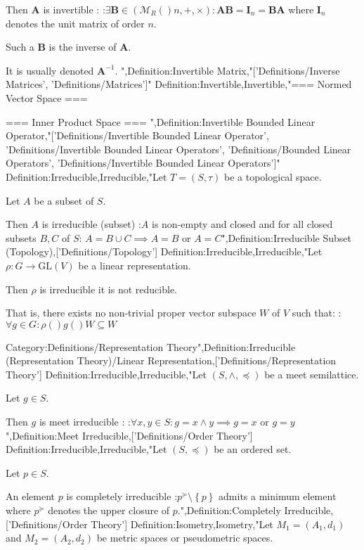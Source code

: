 Then $\mathbf A$ is invertible :
:$\exists \mathbf B \in \left( \mathcal M_R \left(   \right)n, +, \times \right): \mathbf A \mathbf B = \mathbf I_n = \mathbf B \mathbf A$
where $\mathbf I_n$ denotes the unit matrix of order $n$.


Such a $\mathbf B$ is the inverse of $\mathbf A$.

It is usually denoted $\mathbf A^{-1}$.
",Definition:Invertible Matrix,"['Definitions/Inverse Matrices', 'Definitions/Matrices']"
Definition:Invertible,Invertible,"=== Normed Vector Space ===
 

=== Inner Product Space ===
",Definition:Invertible Bounded Linear Operator,"['Definitions/Invertible Bounded Linear Operator', 'Definitions/Invertible Bounded Linear Operators', 'Definitions/Bounded Linear Operators', 'Definitions/Invertible Bounded Linear Operators']"
Definition:Irreducible,Irreducible,"Let $T = \left( S, \tau \right)$ be a topological space.

Let $A$ be a subset of $S$.


Then $A$ is irreducible (subset) 
:$A$ is non-empty and closed and for all closed subsets $B, C$ of $S$: $A = B \cup C \implies A = B$ or $A = C$",Definition:Irreducible Subset (Topology),['Definitions/Topology']
Definition:Irreducible,Irreducible,"Let $\rho: G \to \mathrm {GL} \left( V \right)$ be a linear representation.

Then $\rho$ is irreducible  it is not reducible.


That is,  there exists no non-trivial proper vector subspace $W$ of $V$ such that:
: $\forall g \in G: \rho \left(   \right)g \left(   \right)W \subseteq W$


Category:Definitions/Representation Theory",Definition:Irreducible (Representation Theory)/Linear Representation,['Definitions/Representation Theory']
Definition:Irreducible,Irreducible,"Let $\left({S, \wedge, \preceq}\right)$ be a meet semilattice.

Let $g \in S$.


Then $g$ is meet irreducible :
:$\forall x, y \in S: g = x \wedge y \implies g = x$ or $g = y$",Definition:Meet Irreducible,['Definitions/Order Theory']
Definition:Irreducible,Irreducible,"Let $\left( S, \preceq \right)$ be an ordered set.

Let $p \in S$.

An element $p$ is completely irreducible 
:$p^\succeq \setminus \left\lbrace p \right\rbrace$ admits a minimum element
where $p^\succeq$ denotes the upper closure of $p$.",Definition:Completely Irreducible,['Definitions/Order Theory']
Definition:Isometry,Isometry,"Let $M_1 = \left( A_1, d_1 \right)$ and $M_2 = \left( A_2, d_2 \right)$ be metric spaces or pseudometric spaces.


